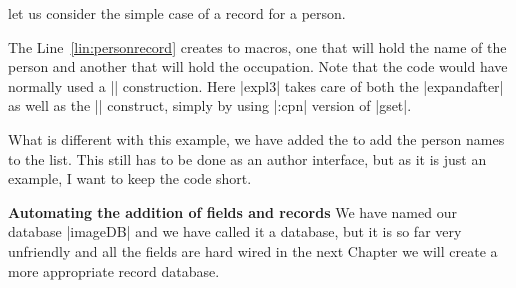 let us consider the simple case of a record for a person.


The Line~\ref{lin:personrecord} creates to macros, one that will hold the name of the person and another that will hold the occupation. Note that the code would have normally used a |\csname| construction. Here |expl3| takes care of both the |expandafter| as well as the |\csname| construct, simply by using |:cpn| version of |gset|.

What is different with this example, we have added the  to add the person names to the list. This still has to be done as an author interface, but as it is just an example, I want to keep the code short. 

\textbf{Automating the addition of fields and records} We have named our database |imageDB| and we have called it a database, but it is so far very unfriendly and all the fields are hard wired in the next Chapter we will create a more appropriate record database.

